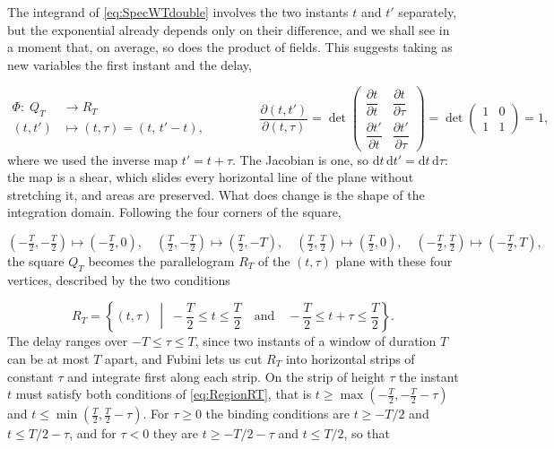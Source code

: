 		The integrand of \eqref{eq:SpecWTdouble} involves the two instants $t$ and $t'$
		separately, but the exponential already depends only on their difference, and we shall
		see in a moment that, on average, so does the product of fields. This suggests taking as
		new variables the first instant and the delay,

		\begin{equation}\label{eq:ChangeTtau}
			\begin{split}
				\Phi:\; Q_{T} &\longrightarrow R_{T}\\
				(t,t') &\longmapsto (t,\tau) = (t,\,t'-t),
			\end{split}
			\qquad\qquad
			\frac{\partial(t,t')}{\partial(t,\tau)} = \det\begin{pmatrix} \dfrac{\partial t}{\partial t} & \dfrac{\partial t}{\partial \tau}\\[2mm] \dfrac{\partial t'}{\partial t} & \dfrac{\partial t'}{\partial \tau}\end{pmatrix}
			= \det\begin{pmatrix} 1 & 0\\ 1 & 1\end{pmatrix} = 1 ,
		\end{equation}
		where we used the inverse map $t'=t+\tau$. The Jacobian is one, so
		$\mathrm{d}t\,\mathrm{d}t'=\mathrm{d}t\,\mathrm{d}\tau$: the map is a shear, which slides
		every horizontal line of the plane without stretching it, and areas are preserved. What
		does change is the shape of the integration domain. Following the four corners of the
		square,

		\begin{equation}
			\left(-\tfrac{T}{2},-\tfrac{T}{2}\right)\mapsto\left(-\tfrac{T}{2},0\right),\quad
			\left(\tfrac{T}{2},-\tfrac{T}{2}\right)\mapsto\left(\tfrac{T}{2},-T\right),\quad
			\left(\tfrac{T}{2},\tfrac{T}{2}\right)\mapsto\left(\tfrac{T}{2},0\right),\quad
			\left(-\tfrac{T}{2},\tfrac{T}{2}\right)\mapsto\left(-\tfrac{T}{2},T\right),
		\end{equation}
		the square $Q_{T}$ becomes the parallelogram $R_{T}$ of the $(t,\tau)$ plane with these
		four vertices, described by the two conditions

		\begin{equation}\label{eq:RegionRT}
			R_{T} = \left\{(t,\tau)\;\middle|\; -\frac{T}{2}\leq t\leq\frac{T}{2}\quad\text{and}\quad -\frac{T}{2}\leq t+\tau\leq\frac{T}{2}\right\}.
		\end{equation}
		The delay ranges over $-T\leq\tau\leq T$, since two instants of a window of duration $T$
		can be at most $T$ apart, and Fubini lets us cut $R_{T}$ into horizontal strips of
		constant $\tau$ and integrate first along each strip. On the strip of height $\tau$ the
		instant $t$ must satisfy both conditions of \eqref{eq:RegionRT}, that is
		$t\geq\max\left(-\tfrac{T}{2},-\tfrac{T}{2}-\tau\right)$ and
		$t\leq\min\left(\tfrac{T}{2},\tfrac{T}{2}-\tau\right)$. For $\tau\geq0$ the binding
		conditions are $t\geq-T/2$ and $t\leq T/2-\tau$, and for $\tau<0$ they are
		$t\geq-T/2-\tau$ and $t\leq T/2$, so that

